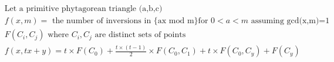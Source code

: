 \documentclass[10pt,a4paper]{letter}
\begin{document}
\begin{align*}
	&\text{Let a primitive phytagorean triangle (a,b,c)}\\
	&f(x,m)= \text{ the number of inversions in \{ax mod m\} for }  0 < a < m \text{ assuming gcd(x,m)=1 }\\	
	&F(C_{i},C_{j}) \text{ where } C_{i},C_{j} \text{ are distinct sets of points }\\
	&f(x,tx+y)=t\times F(C_{0})+\frac{t \times (t-1)}{2}\times F(C_{0},C_{1})+t \times F(C_{0},C_{y})+F(C_{y})\\ 
\end{align*}
\end{document}
